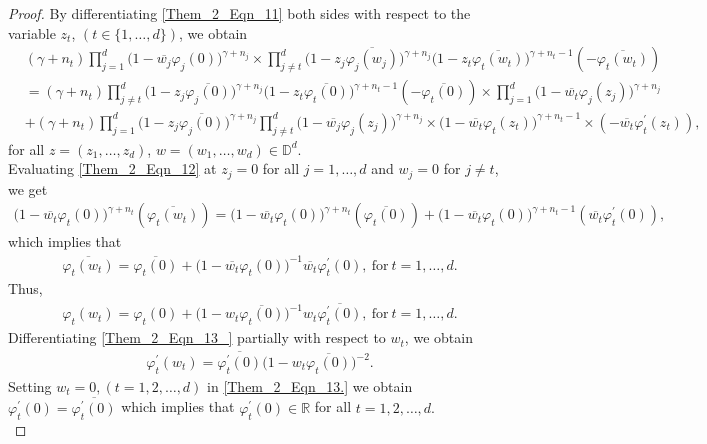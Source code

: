 \documentclass[12pt, reqno]{amsart}
\theoremstyle{definition}
\theoremstyle{remark}
\numberwithin{equation}{section}
\begin{document}
\begin{proof}
 
 	By differentiating \eqref{Them_2_Eqn_11} both sides with respect to the variable $z_t$, $(t\in\{1, \dots, d\})$, we obtain 	
 	 	\begin{align}\label{Them_2_Eqn_12}
 	& (\gamma+n_t) \prod_{j=1}^d\big(1-\overline{w_j}\varphi_j(0)\big)^{\gamma+n_j}\times	\prod_{j\neq t}^d\big(1-z_j\overline{\varphi_j(w_j)}\big)^{\gamma+n_j}\big(1-z_t\overline{\varphi_t(w_t)}\big)^{\gamma+n_t-1}(-\overline{\varphi_t(w_t)})\nonumber\\
 	&= (\gamma+n_t)\prod_{j\neq t}^d\big(1-z_j\overline{\varphi_j(0)}\big)^{\gamma+n_j}\big(1-z_t\overline{\varphi_t(0)}\big)^{\gamma+n_t-1}(-\overline{\varphi_t(0)})\times	\prod_{j=1}^d\big(1-\overline{w_t}\varphi_j(z_j)\big)^{\gamma+n_j}\nonumber\\
 	&+(\gamma+n_t)\prod_{j=1}^d\big(1-z_j\overline{\varphi_j(0)}\big)^{\gamma+n_j}\prod_{j\neq t}^d\big(1-\overline{w_j}\varphi_j(z_j)\big)^{\gamma+n_j}\times	\big(1-\overline{w_t}\varphi_t(z_t)\big)^{\gamma+n_t-1}\times(-\overline{w_t}\varphi_t^{\prime}(z_t)),
 	\end{align}
 	 for all $z=(z_1, \dots, z_d)$, $w=(w_1, \dots, w_d)\in \mathbb{D}^d$.\\
 	 
 	Evaluating \eqref{Them_2_Eqn_12} at $z_j=0$ for all $j=1, \dots, d$ and $w_j=0$ for $j\neq t$, we get 
 	\begin{align}\label{Them_2_Eqn_13}
 	\big(1-\overline{w_t}\varphi_t(0)\big)^{\gamma+n_t}(\overline{\varphi_t(w_t)})=	\big(1-\overline{w_t}\varphi_t(0)\big)^{\gamma+n_t}(\overline{\varphi_t(0)})+\big(1-\overline{w_t}\varphi_t(0)\big)^{\gamma+n_t-1}(\overline{w_t}\varphi_t^{\prime}(0)),
 	\end{align} 
 	which implies that 
 	\begin{gather*}
 	\overline{\varphi_t(w_t)}=\overline{\varphi_t(0)}+\big(1-\overline{w_t}\varphi_t(0)\big)^{-1}\overline{w_t}\varphi_t^{\prime}(0),~ \mbox{for}~ t=1, \dots, d.
 	\end{gather*}
 	Thus,
 	 	\begin{align}\label{Them_2_Eqn_13_}
 	\varphi_t(w_t)=\varphi_t(0)+\big(1-w_t\overline{\varphi_t(0)}\big)^{-1}w_t\overline{\varphi_t^{\prime}(0)},~ \mbox{for}~ t=1, \dots, d.
 	\end{align}
 Differentiating \eqref{Them_2_Eqn_13_} partially with respect to $w_t$, we obtain 
 	\begin{align}\label{Them_2_Eqn_13.}
 \varphi_t^{\prime}(w_t)=\overline{\varphi_t^{\prime}(0)}\big(1-w_t\overline{\varphi_t(0)}\big)^{-2}.
 \end{align}
 Setting $w_t=0, (t=1, 2, \dots, d)$ in \eqref{Them_2_Eqn_13.} we obtain $\varphi_t^{\prime}(0)=\overline{\varphi_t^{\prime}(0)}$ which implies that $\varphi_t^{\prime}(0)\in \mathbb{R}$ for all $t=1, 2, \dots, d.$\\
 

\end{proof}
\end{document}

